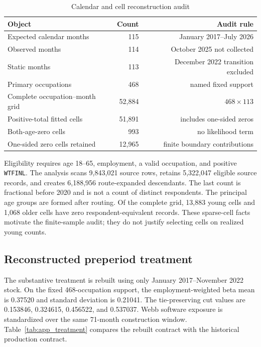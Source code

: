 \begin{table}[!htbp]
\centering
\caption{Calendar and cell reconstruction audit}\label{tab:app_calendar}
\begin{tabular}{lrr}
\toprule
Object & Count & Audit rule \\
\midrule
Expected calendar months & 115 & January 2017--July 2026 \\
Observed months & 114 & October 2025 not collected \\
Static months & 113 & December 2022 transition excluded \\
Primary occupations & 468 & named fixed support \\
Complete occupation--month grid & 52,884 & $468\times113$ \\
Positive-total fitted cells & 51,891 & includes one-sided zeros \\
Both-age-zero cells & 993 & no likelihood term \\
One-sided zero cells retained & 12,965 & finite boundary contributions \\
\bottomrule
\end{tabular}
\end{table}

Eligibility requires age 18--65, employment, a valid occupation, and positive \texttt{WTFINL}.  The analysis scans 9,843,021 source rows, retains 5,322,047 eligible source records, and creates 6,188,956 route-expanded descendants.  The last count is fractional before 2020 and is not a count of distinct respondents.  The principal age groups are formed after routing.  Of the complete grid, 13,883 young cells and 1,068 older cells have zero respondent-equivalent records.  These sparse-cell facts motivate the finite-sample audit; they do not justify selecting cells on realized young counts.

\subsection{Reconstructed preperiod treatment}

The substantive treatment is rebuilt using only January 2017--November 2022 stock.  On the fixed 468-occupation support, the employment-weighted beta mean is 0.37520 and standard deviation is 0.21041.  The tie-preserving cut values are 0.153846, 0.324615, 0.456522, and 0.537037.  Webb software exposure is standardized over the same 71-month construction window.  Table~\ref{tab:app_treatment} compares the rebuilt contract with the historical production contract.

